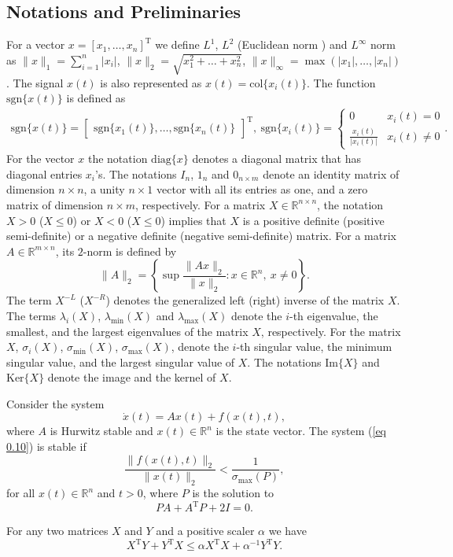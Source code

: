 \documentclass[12pt,draftcls,onecolumn]{IEEEtran}
\begin{document}
\subsection{Notations and Preliminaries}
For a vector $x=\left[x_1,\dots,x_n\right]^{\text{T}}$ we define  $L^1$, $L^2$ (Euclidean norm ) and $L^\infty$ norm as $\|x\|_1=\sum_{i=1}^n|x_i|$, $\|x\|_2=\sqrt {x_1^2+\dots+x_n^2}$, $\|x\|_{\infty}=\max (|x_1|,\dots,|x_n|)$. The signal $x(t)$ is also represented as $x(t)=\text{col}\{x_i(t)\}$. The function $\text{sgn}\{x(t)\}$ is defined as
\begin{eqnarray}
\text{sgn}\{x(t)\}=\begin{bmatrix}\text{sgn}\{x_1(t)\},\dots,\text{sgn}\{x_n(t)\}\end{bmatrix}^{\text{T}},\ \text{sgn}\{x_i(t)\}=\left \{ \begin{array}{rcl}0&x_i(t)=0\\ \frac{x_i(t)}{|x_i(t)|}& x_i(t)\ne 0 \end{array}\right.\label{sgn}.
\end{eqnarray}
 For the vector $x$ the notation $\text{diag}\{x\}$ denotes a diagonal matrix that has diagonal entries $x_i$'s. The notations $I_n$, $1_n$ and $0_{n\times m}$ denote  an identity matrix of dimension $n\times n$, a unity $n\times 1$ vector with all its entries as one, and a zero matrix of dimension $n \times m$, respectively. For a matrix $X\in \mathbb{R}^{n\times n}$, the notation $X>0$ ($X\leq 0$) or $X<0$ ($X\leq 0$) implies that $X$ is a positive definite (positive semi-definite) or a negative definite (negative semi-definite) matrix. For a matrix $A\in\mathbb{R}^{m\times n}$, its $2$-norm is defined by 
 $$\|A\|_2=\left\{\sup\frac{\|Ax\|_2}{\|x\|_2}:x\in\mathbb{R}^n,\ x\ne0\right\}.$$
  The term $X^{-L}$ ($X^{-R}$) denotes the generalized left (right) inverse of the matrix $X$. The terms $\lambda_{i}(X)$, $\lambda_{\text{min}}(X)$ and $\lambda_{\text{max}}(X)$ denote the $i$-th  eigenvalue, the smallest, and the largest eigenvalues of the matrix $X$, respectively. For the matrix $X$, $\sigma_i(X)$, $\sigma_{\min}(X)$, $\sigma_{\max}(X)$,  denote the $i$-th  singular value, the minimum singular value, and the largest singular value of $X$. 
The notations $\text{Im}\{X\}$ and $\text{Ker}\{X\}$  denote the image and the kernel of $X$. 
\begin{theorems}\label{theorem 0.3}\cite{Yedavalli14}
Consider the system 
\begin{equation}
\dot x(t)=Ax(t)+f(x(t),t),\label{eq 0.10}
\end{equation}
where $A$ is Hurwitz stable and $x(t)\in\mathbb{R}^n$ is the state vector. The system (\ref{eq 0.10}) is stable if 
$$\frac{\|f(x(t),t)\|_2}{\|x(t)\|_2}<\frac{1}{\sigma_{\text{max}}(P)},$$
for all $x(t)\in\mathbb{R}^n$ and $t>0$, where $P$ is the solution to 
$$PA+A^{\text{T}}P+2I=0.$$
\end{theorems}
\begin{facts}\label{Fact1}
For any two matrices $X$ and $Y$ and a positive scaler $\alpha$ we have 
$$X^{\text{T}}Y+Y^{\text{T}}X\leq \alpha X^{\text{T}}X+\alpha^{-1}Y^{\text{T}}Y.$$
\end{facts}
\end{document}
